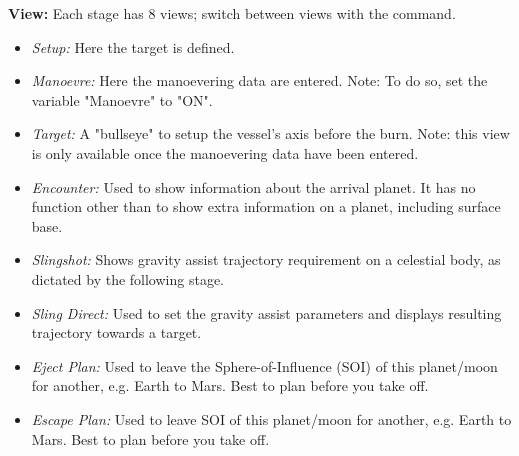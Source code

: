 \documentclass[Orbiter User Manual.tex]{subfiles}
\begin{document}
\textbf{View:} Each stage has 8 views; switch between views with the 
command.
\begin{itemize}
	\item \emph{Setup:} Here the target is defined.
	\item \emph{Manoevre:} Here the manoevering data are entered. Note: To do
		so, set the variable "Manoevre" to "ON".
	\item \emph{Target:} A "bullseye" to setup the vessel's axis before the
		burn. Note: this view is only available once the manoevering data have
		been entered.
	\item \emph{Encounter:} Used to show information about the arrival planet.
		It has no function other than to show extra information on a planet,
		including surface base.
	\item \emph{Slingshot:} Shows gravity assist trajectory requirement on a
		celestial body, as dictated by the following stage.
	\item \emph{Sling Direct:} Used to set the gravity assist parameters and
		displays resulting trajectory towards a target.
	\item \emph{Eject Plan:} Used to leave the Sphere-of-Influence (SOI) of
		this planet/moon for another, e.g. Earth to Mars. Best to plan before
		you take off.
	\item \emph{Escape Plan:} Used to leave SOI of this planet/moon for another,
		e.g. Earth to Mars. Best to plan before you take off.
\end{itemize}
\end{document}
